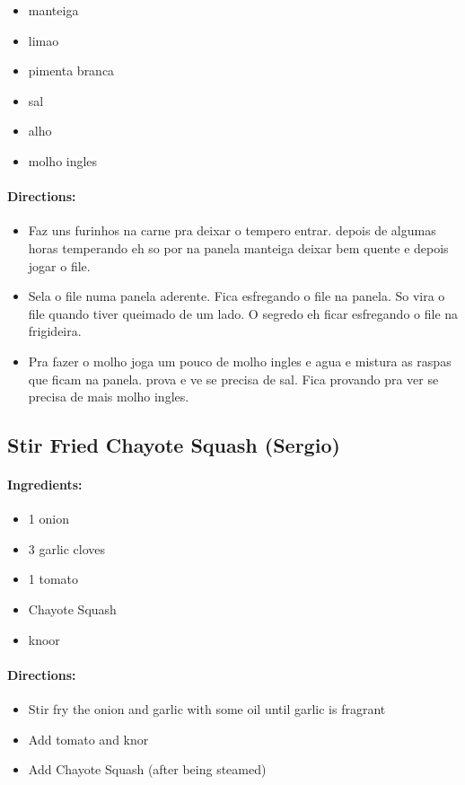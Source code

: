 \documentclass{article}
\begin{document}
\begin{itemize}
	\item manteiga
	\item limao
	\item pimenta branca
	\item sal
	\item alho
	\item molho ingles
\end{itemize}

\paragraph{Directions:}
\begin{itemize}
	\item Faz uns furinhos na carne pra deixar o tempero entrar. depois de algumas horas temperando eh so por na panela manteiga deixar bem quente e depois jogar o file.
	\item Sela o file numa panela aderente. Fica esfregando o file na panela. So vira o file quando tiver queimado de um lado. O segredo eh ficar esfregando o file na frigideira.
	\item Pra fazer o molho joga um pouco de molho ingles e agua e mistura as raspas que ficam na panela. prova e ve se precisa de sal. Fica provando pra ver se precisa de mais molho ingles.
\end{itemize}

\subsection{Stir Fried Chayote Squash (Sergio)}

\paragraph{Ingredients:}

\begin{itemize}
	\item 1 onion
	\item 3 garlic cloves
	\item 1 tomato
	\item Chayote Squash
	\item knoor 
\end{itemize}

\paragraph{Directions:}
\begin{itemize}
	\item Stir fry the onion and garlic with some oil until garlic is fragrant
	\item Add tomato and knor
	\item Add Chayote Squash (after being steamed)
\end{itemize}
\end{document}

